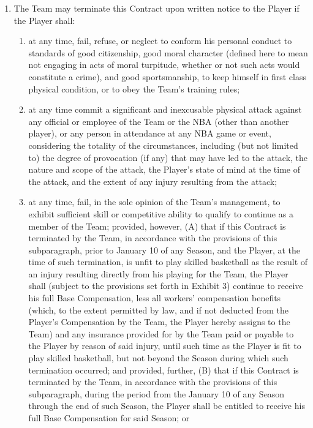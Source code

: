 \documentclass[
]{book}
\providecommand{\tightlist}{%
  \setlength{\itemsep}{0pt}\setlength{\parskip}{0pt}}
\begin{document}
\begin{enumerate}
\def\labelenumi{(\alph{enumi})}
\tightlist
\item
  The Team may terminate this Contract upon written notice to the Player if the Player shall:

  \begin{enumerate}
  \def\labelenumii{(\roman{enumii})}
  \tightlist
  \item
    at any time, fail, refuse, or neglect to conform his personal conduct to standards of good citizenship, good moral character (defined here to mean not engaging in acts of moral turpitude, whether or not such acts would constitute a crime), and good sportsmanship, to keep himself in first class physical condition, or to obey the Team's training rules;
  \item
    at any time commit a significant and inexcusable physical attack against any official or employee of the Team or the NBA (other than another player), or any person in attendance at any NBA game or event, considering the totality of the circumstances, including (but not limited to) the degree of provocation (if any) that may have led to the attack, the nature and scope of the attack, the Player's state of mind at the time of the attack, and the extent of any injury resulting from the attack;
  \item
    at any time, fail, in the sole opinion of the Team's management, to exhibit sufficient skill or competitive ability to qualify to continue as a member of the Team; provided, however, (A) that if this Contract is terminated by the Team, in accordance with the provisions of this subparagraph, prior to January 10 of any Season, and the Player, at the time of such termination, is unfit to play skilled basketball as the result of an injury resulting directly from his playing for the Team, the Player shall (subject to the provisions set forth in Exhibit 3) continue to receive his full Base Compensation, less all workers' compensation benefits (which, to the extent permitted by law, and if not deducted from the Player's Compensation by the Team, the Player hereby assigns to the Team) and any insurance provided for by the Team paid or payable to the Player by reason of said injury, until such time as the Player is fit to play skilled basketball, but not beyond the Season during which such termination occurred; and provided, further, (B) that if this Contract is terminated by the Team, in accordance with the provisions of this subparagraph, during the period from the January 10 of any Season through the end of such Season, the Player shall be entitled to receive his full Base Compensation for said Season; or

\end{enumerate}
\end{enumerate}
\end{document}

